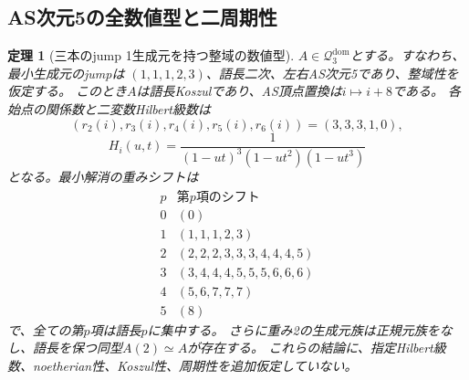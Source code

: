 \documentclass[11pt,a4paper]{ltjsarticle}
\newtheorem{theorem}{定理}[section]
\theoremstyle{definition}
\begin{document}
\subsection{AS次元5の全数値型と二周期性}
\begin{theorem}[三本のjump 1生成元を持つ整域の数値型]
\label{genidx:thm:five-dimensional-numerics}
$A\in\mathcal Q_3^{\mathrm{dom}}$とする。すなわち、最小生成元のjumpは
$(1,1,1,2,3)$、語長二次、左右AS次元5であり、整域性を仮定する。
このとき$A$は語長Koszulであり、AS頂点置換は$i\mapsto i+8$である。
各始点の関係数と二変数Hilbert級数は
\[
(r_2(i),r_3(i),r_4(i),r_5(i),r_6(i))=(3,3,3,1,0),
\]
\[
H_i(u,t)=\frac1{(1-ut)^3(1-ut^2)(1-ut^3)}
\]
となる。最小解消の重みシフトは
\[
\begin{array}{c|l}
p&\text{第$p$項のシフト}\\\hline
0&(0)\\
1&(1,1,1,2,3)\\
2&(2,2,2,3,3,3,4,4,4,5)\\
3&(3,4,4,4,5,5,5,6,6,6)\\
4&(5,6,7,7,7)\\
5&(8)
\end{array}
\]
で、全ての第$p$項は語長$p$に集中する。
さらに重み2の生成元族は正規元族をなし、語長を保つ同型$A(2)\simeq A$が存在する。
これらの結論に、指定Hilbert級数、noetherian性、Koszul性、周期性を追加仮定していない。
\end{theorem}
\end{document}
